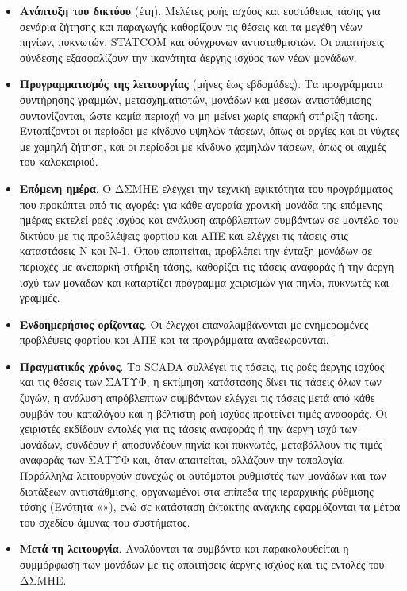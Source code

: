 \begin{itemize}
\item \textbf{Ανάπτυξη του δικτύου} (έτη). Μελέτες ροής ισχύος και ευστάθειας τάσης για
      σενάρια ζήτησης και παραγωγής καθορίζουν τις θέσεις και τα μεγέθη νέων πηνίων, πυκνωτών,
      STATCOM και σύγχρονων αντισταθμιστών. Οι απαιτήσεις σύνδεσης εξασφαλίζουν την ικανότητα
      άεργης ισχύος των νέων μονάδων.
\item \textbf{Προγραμματισμός της λειτουργίας} (μήνες έως εβδομάδες). Τα προγράμματα
      συντήρησης γραμμών, μετασχηματιστών, μονάδων και μέσων αντιστάθμισης συντονίζονται,
      ώστε καμία περιοχή να μη μείνει χωρίς επαρκή στήριξη τάσης. Εντοπίζονται οι περίοδοι με
      κίνδυνο υψηλών τάσεων, όπως οι αργίες και οι νύχτες με χαμηλή ζήτηση, και οι περίοδοι με
      κίνδυνο χαμηλών τάσεων, όπως οι αιχμές του καλοκαιριού.
\item \textbf{Επόμενη ημέρα}. Ο ΔΣΜΗΕ ελέγχει την τεχνική εφικτότητα του προγράμματος που
      προκύπτει από τις αγορές: για κάθε αγοραία χρονική μονάδα της επόμενης ημέρας εκτελεί
      ροές ισχύος και ανάλυση απρόβλεπτων συμβάντων σε μοντέλο του δικτύου με τις προβλέψεις φορτίου
      και ΑΠΕ και ελέγχει τις τάσεις στις καταστάσεις N και N-1. Όπου απαιτείται, προβλέπει την
      ένταξη μονάδων σε περιοχές με ανεπαρκή στήριξη τάσης, καθορίζει τις τάσεις αναφοράς ή την
      άεργη ισχύ των μονάδων και καταρτίζει πρόγραμμα χειρισμών για πηνία, πυκνωτές και
      γραμμές.
\item \textbf{Ενδοημερήσιος ορίζοντας}. Οι έλεγχοι επαναλαμβάνονται με ενημερωμένες
      προβλέψεις φορτίου και ΑΠΕ και τα προγράμματα αναθεωρούνται.
\item \textbf{Πραγματικός χρόνος}. Το SCADA συλλέγει τις τάσεις, τις ροές άεργης ισχύος και τις
      θέσεις των ΣΑΤΥΦ, η εκτίμηση κατάστασης δίνει τις τάσεις όλων των ζυγών, η
      ανάλυση απρόβλεπτων συμβάντων ελέγχει τις τάσεις μετά από κάθε συμβάν του καταλόγου και
      η βέλτιστη ροή ισχύος προτείνει τιμές αναφοράς. Οι χειριστές εκδίδουν εντολές για τις
      τάσεις αναφοράς ή την άεργη ισχύ των μονάδων, συνδέουν ή αποσυνδέουν πηνία και πυκνωτές, μεταβάλλουν
      τις τιμές αναφοράς των ΣΑΤΥΦ και, όταν απαιτείται, αλλάζουν την τοπολογία.
      Παράλληλα λειτουργούν συνεχώς οι αυτόματοι ρυθμιστές των μονάδων και των διατάξεων
      αντιστάθμισης, οργανωμένοι στα επίπεδα της ιεραρχικής ρύθμισης τάσης (Ενότητα
      «»), ενώ σε κατάσταση έκτακτης ανάγκης εφαρμόζονται τα μέτρα του
      σχεδίου άμυνας του συστήματος.
\item \textbf{Μετά τη λειτουργία}. Αναλύονται τα συμβάντα και παρακολουθείται η συμμόρφωση των
      μονάδων με τις απαιτήσεις άεργης ισχύος και τις εντολές του ΔΣΜΗΕ.
\end{itemize}

